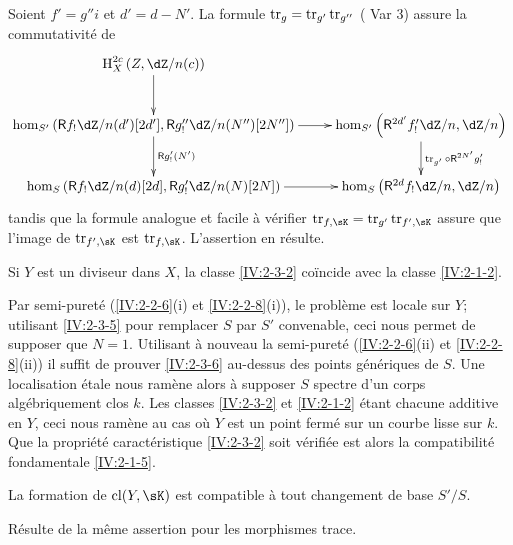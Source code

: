 Soient $f'=g'' i$ et $d'=d-N'$. La formule $\operatorname{tr}_g=\operatorname{tr}_{g'}\operatorname{tr}_{g''}$ 
(\cite[XVIII.2.9]{sga4} Var 3) assure la commutativité de 
\[\xymatrix{
  \h_X^{2 c}\left(Z,\dZ/n(c)\right) \ar[d] \\
  \hom_{S'}\left(\R f_!\dZ/n(d')[2 d'],\R g_!''\dZ/n(N'')[2 N'']\right) \ar[r] \ar[d]^-{\R g_!'(N')} 
    & \hom_{S'}\left(\R^{2 d'} f_!' \dZ/n,\dZ/n\right) \ar[d]^-{\tr_{g'}\circ \R^{2 N'} g_!'} \\
  \hom_S\left(\R f_!\dZ/n(d)[2d],\R g_!'\dZ/n(N)[2 N]\right) \ar[r] 
    & \hom_S\left(\R^{2 d} f_!\dZ/n,\dZ/n\right)
}\]
tandis que la formule analogue et facile à vérifier 
$\tr_{f,\sK}=\tr_{g'}\tr_{f',\sK}$ assure que l'image de $\tr_{f',\sK}$ est 
$\tr_{f,\sK}$. L'assertion en résulte. 





\begin{lemma}\label{IV:2-3-6}
Si $Y$ est un diviseur dans $X$, la classe \ref{IV:2-3-2} coïncide avec la 
classe \ref{IV:2-1-2}. 
\end{lemma}

Par semi-pureté (\ref{IV:2-2-6}(i) et \ref{IV:2-2-8}(i)), le problème est 
locale sur $Y$; utilisant \ref{IV:2-3-5} pour remplacer $S$ par $S'$ 
convenable, ceci nous permet de supposer que $N=1$. Utilisant à nouveau la 
semi-pureté (\ref{IV:2-2-6}(ii) et \ref{IV:2-2-8}(ii)) il suffit de prouver 
\ref{IV:2-3-6} au-dessus des points génériques de $S$. Une localisation 
étale nous ramène alors à supposer $S$ spectre d'un corps 
algébriquement clos $k$. Les classes \ref{IV:2-3-2} et \ref{IV:2-1-2} étant 
chacune additive en $Y$, ceci nous ramène au cas où $Y$ est un point 
fermé sur un courbe lisse sur $k$. Que la propriété caractéristique 
\ref{IV:2-3-2} soit vérifiée est alors la compatibilité fondamentale 
\ref{IV:2-1-5}. 





\begin{lemma}\label{IV:2-3-7}
La formation de $\cl(Y,\sK)$ est compatible à tout changement de base 
$S'/S$.
\end{lemma}

Résulte de la même assertion pour les morphismes trace.





